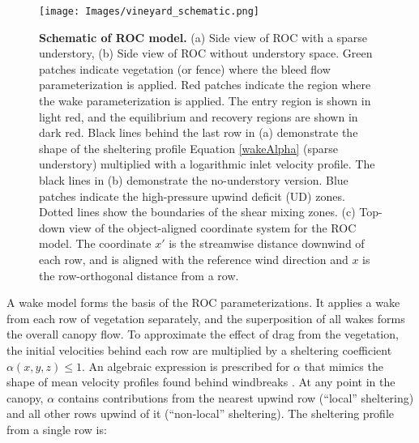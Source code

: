 \begin{figure}[H]\label{fig:ROCmodel}
\texttt{[image: Images/vineyard\_schematic.png]}
\caption{\textbf{Schematic of ROC model.} (a) Side view of ROC with a sparse understory, (b) Side view of ROC without understory space. Green patches indicate vegetation (or fence) where the bleed flow parameterization is applied. Red patches indicate the region where the wake parameterization is applied. The entry region is shown in light red, and the equilibrium and recovery regions are shown in dark red.  Black lines behind the last row in (a) demonstrate the shape of the sheltering profile Equation \ref{wakeAlpha} (sparse understory) multiplied with a logarithmic inlet velocity profile. The black lines in (b) demonstrate the no-understory version. Blue patches indicate the high-pressure upwind deficit (UD) zones. Dotted lines show the boundaries of the shear mixing zones. 
    (c) Top-down view of the object-aligned coordinate system for the ROC model. The coordinate $x'$ is the streamwise distance downwind of each row, and is aligned with the reference wind direction and $x$ is the row-orthogonal distance from a row.}
\end{figure}


A wake model forms the basis of the ROC parameterizations. It applies a wake from each row of vegetation separately, and the superposition of all wakes forms the overall canopy flow.
To approximate the effect of drag from the vegetation, the initial velocities behind each row are multiplied by a sheltering coefficient $\alpha(x,y,z) \leq 1$.
An algebraic expression is prescribed for $\alpha$ that mimics the shape of mean velocity profiles found behind windbreaks \cite{speckart2014method}. At any point in the canopy, $\alpha$ contains contributions from the nearest upwind row (``local'' sheltering) and all other rows upwind of it (``non-local'' sheltering).
The sheltering profile from a single row is:

